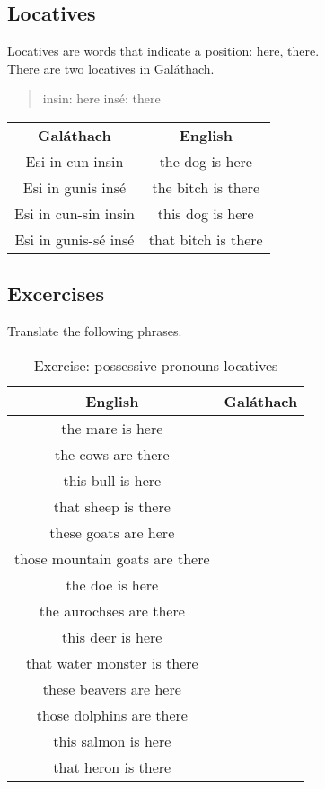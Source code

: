 \subsection{Locatives}

Locatives are words that indicate a position: here, there.\\
There are two locatives in Gal\'{a}thach.
\begin{quote}
insin: here
ins\'{e}: there
\end{quote}

\begin{table}[H]
\centering
\begin{tabular}{cc}
  \toprule
  \textbf{Gal\'{a}thach} & \textbf{English}\\
  \cmidrule(lr){1-1}\cmidrule(lr){2-2}
  Esi in cun insin & the dog is here\\
  Esi in gunis ins\'{e} & the bitch is there\\
  Esi in cun-sin insin & this dog is here\\
  Esi in gunis-s\'{e} ins\'{e} & that bitch is there\\
  \bottomrule
\end{tabular}
\label{examples_locatives}
\end{table}

\newpage
\subsection{Excercises}

Translate the following phrases.
\begin{table}[H]
\centering
\begin{tabular}{|c|M{5.0cm}|}
  \toprule
  \textbf{English} & \textbf{Gal\'{a}thach}\\
  \toprule
  the mare is here & \\
  \midrule
  the cows are there & \\
  \midrule
  this bull is here & \\
  \midrule
  that sheep is there & \\
  \midrule
  these goats are here & \\
  \midrule
  those mountain goats are there & \\
  \midrule
  the doe is here & \\
  \midrule
  the aurochses are there & \\
  \midrule
  this deer is here & \\
  \midrule
  that water monster is there & \\
  \midrule
  these beavers are here & \\
  \midrule
  those dolphins are there & \\
  \midrule
  this salmon is here & \\
  \midrule
  that heron is there & \\
  \bottomrule
\end{tabular}
\label{exercise_possessive_pronouns_locatives}
\caption{Exercise: possessive pronouns locatives}
\end{table}

